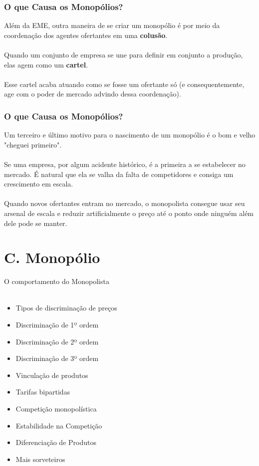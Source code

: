 \documentclass{beamer}[10]
\begin{document}
\begin{frame}
	\frametitle{O que Causa os Monopólios?}
	Além da EME, outra maneira de se criar um monopólio é por meio da coordenação dos agentes ofertantes em uma \textbf{colusão}.
	\\~\\
	Quando um conjunto de empresa se une para definir em conjunto a produção, elas agem como um \textbf{cartel}.
	\\~\\
	Esse cartel acaba atuando como se fosse um ofertante só (e consequentemente, age com o poder de mercado advindo dessa coordenação).
\end{frame}

\begin{frame}
	\frametitle{O que Causa os Monopólios?}
	Um terceiro e último motivo para o nascimento de um monopólio é o bom e velho "cheguei primeiro".
	\\~\\
	Se uma empresa, por algum acidente histórico, é a primeira a se estabelecer no mercado. É natural que ela se valha da falta de competidores e consiga um crescimento em escala.
	\\~\\
	Quando novos ofertantes entram no mercado, o monopolista consegue usar seu arsenal de escala e reduzir artificialmente o preço até o ponto onde ninguém além dele pode se manter.
\end{frame}

\section{C. Monopólio}

\begin{frame}
	\huge O comportamento do Monopolista \normalsize
	\\~\\
	\begin{itemize}
		\item Tipos de discriminação de preços
		\item Discriminação de 1º ordem
		\item Discriminação de 2º ordem
		\item Discriminação de 3º ordem
		\item Vinculação de produtos
		\item Tarifas bipartidas
		\item Competição monopolística
		\item Estabilidade na Competição
		\item Diferenciação de Produtos
		\item Mais sorveteiros
	\end{itemize}
\end{frame}
\end{document}
